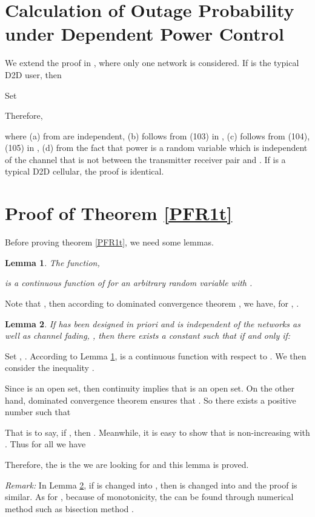 \documentclass[12pt, draftclsnofoot, journal, letterpaper, onecolumn]{IEEEtran}
\newtheorem{lemma}{Lemma}[section]
\begin{document}
\section{Calculation of Outage Probability under Dependent Power Control}\label{COPDPC}
\begin{IEEEproof}
We extend the proof in \cite{OP}, where only one network is considered.
If  is the typical D2D user,
then

Set

Therefore,

where (a) from  are independent, (b) follows from (103) in \cite{OP}, (c) follows from (104),(105) in \cite{OP}, (d) from the fact that power is a random variable which is independent of the channel that is not between the transmitter receiver pair and . If  is a typical D2D cellular, the proof is identical.
\end{IEEEproof}
\section{Proof of Theorem \ref{PFR1t}}\label{PFR1proof}
Before proving theorem \ref{PFR1t}, we need some lemmas.
\begin{lemma}\label{continuity}
The function,

is a continuous function of  for an arbitrary random variable  with .
\end{lemma}
\begin{IEEEproof}
Note that , then according to dominated convergence theorem \cite{probability}, we have, for , .
\end{IEEEproof}
\begin{lemma}\label{qd}
If  has been designed in priori and is independent of the networks as well as channel fading, , then there exists a constant  such that  if and only if:

\end{lemma}
\begin{IEEEproof}
Set , . According to Lemma \ref{continuity},  is a continuous function with respect to . We then consider the inequality .

Since  is an open set, then continuity implies that  is an open set. On the other hand, dominated convergence theorem ensures that . So there exists a positive number  such that


That is to say, if , then .
Meanwhile, it is easy to show that  is non-increasing with . Thus for all  we have


Therefore, the  is the  we are looking for and this lemma is proved.
\end{IEEEproof}
\emph{Remark:} In Lemma \ref{qd}, if  is changed into , then  is changed into  and the proof is similar.
As for , because of monotonicity, the  can be found through numerical method such as bisection method \cite{bisection}.
\end{document}
